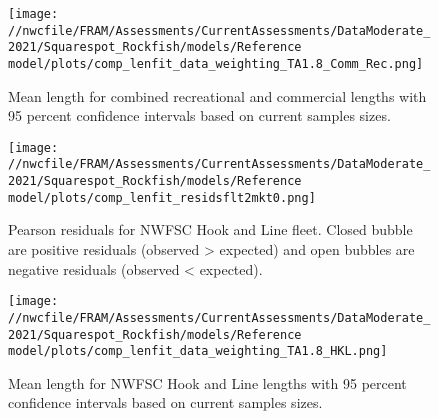 \documentclass[11pt,
  english,
  a4paper,
]{article}
\begin{document}
\tagmcend\tagstructend


\begin{figure}
\centering
\texttt{[image: //nwcfile/FRAM/Assessments/CurrentAssessments/DataModerate\_2021/Squarespot\_Rockfish/models/Reference model/plots/comp\_lenfit\_data\_weighting\_TA1.8\_Comm\_Rec.png]}
\caption{Mean length for combined recreational and commercial lengths with 95 percent confidence intervals based on current samples sizes.\label{fig:rec-com-mean-len-fit}}
\end{figure}

\tagmcend\tagstructend


\begin{figure}
\centering
\texttt{[image: //nwcfile/FRAM/Assessments/CurrentAssessments/DataModerate\_2021/Squarespot\_Rockfish/models/Reference model/plots/comp\_lenfit\_residsflt2mkt0.png]}
\caption{Pearson residuals for NWFSC Hook and Line fleet. Closed bubble are positive residuals (observed \textgreater{} expected) and open bubbles are negative residuals (observed \textless{} expected).\label{fig:hkl-pearson}}
\end{figure}

\tagmcend\tagstructend


\begin{figure}
\centering
\texttt{[image: //nwcfile/FRAM/Assessments/CurrentAssessments/DataModerate\_2021/Squarespot\_Rockfish/models/Reference model/plots/comp\_lenfit\_data\_weighting\_TA1.8\_HKL.png]}
\caption{Mean length for NWFSC Hook and Line lengths with 95 percent confidence intervals based on current samples sizes.\label{fig:hkl-mean-len-fit}}
\end{figure}

\tagmcend\tagstructend
\end{document}
